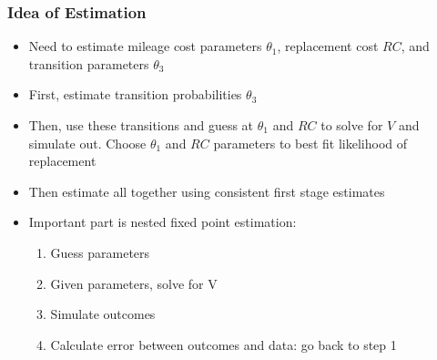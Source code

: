 \documentclass{beamer}
\begin{document}
\begin{frame}
\frametitle{Idea of Estimation}
\begin{itemize}
\item Need to estimate mileage cost parameters $\theta_1$, replacement cost $RC$, and transition parameters $\theta_3$
\bigskip
\item First, estimate transition probabilities $\theta_3$
\bigskip
\item Then, use these transitions and guess at $\theta_1$ and $RC$ to solve for $V$ and simulate out.  Choose $\theta_1$ and $RC$ parameters to best fit likelihood of replacement
\bigskip
\item Then estimate all together using consistent first stage estimates
\bigskip
\item Important part is nested fixed point estimation:
\begin{enumerate}
\item Guess parameters
\item Given parameters, solve for V
\item Simulate outcomes
\item Calculate error between outcomes and data: go back to step 1
\end{enumerate}
\end{itemize}
\end{frame}
\end{document}
